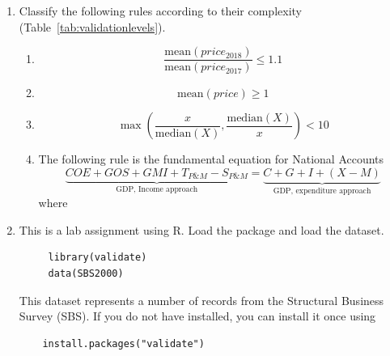 \begin{enumerate}
  \item Classify the following rules according to their complexity
        (Table~\ref{tab:validationlevels}).
    \begin{enumerate}
      \item
      $$
      \frac{\textrm{mean}(price_{2018})}{\textrm{mean}(price_{2017})} \leq 1.1  
      $$

      \item
      $$
      \textrm{mean}(price) \geq 1  
      $$

      \item
      $$
      \max\left(
      \frac{x}{\textrm{median}(X)},\frac{\textrm{median}(X)}{x}
      \right) < 10
      $$

      \item The following rule is the fundamental equation for National Accounts
      $$
      \underbrace{COE + GOS + GMI + T_{P\&M} - S_{P\&M}}_{\textrm{GDP, Income approach}} = 
      \underbrace{C + G + I + (X - M)}_{\textrm{GDP, expenditure approach}}
      $$
      where
    \end{enumerate}
  \item This is a lab assignment using R. Load the  package and load the 
    dataset. 
   \begin{verbatim}
     library(validate)
     data(SBS2000)
   \end{verbatim} 
   This dataset represents a number of records from the
   Structural Business Survey (SBS).
   If you do not have  installed, you can install it once using
  \begin{verbatim}
    install.packages("validate")

\end{verbatim}
\end{enumerate}
